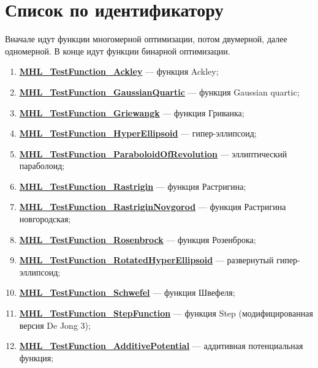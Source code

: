 \section {Список по идентификатору}

Вначале идут функции многомерной оптимизации, потом двумерной, далее одномерной. В конце идут функции бинарной оптимизации.

\begin{enumerate}
 \item \hyperref[TestFunctions:section:MHL_TestFunction_Ackley]{\textbf{MHL\_TestFunction\_Ackley}} --- функция Ackley;
 \item \hyperref[TestFunctions:section:MHL_TestFunction_GaussianQuartic]{\textbf{MHL\_TestFunction\_GaussianQuartic}} --- функция Gaussian quartic;
 \item \hyperref[TestFunctions:section:MHL_TestFunction_Griewangk]{\textbf{MHL\_TestFunction\_Griewangk}} --- функция Гриванка;
 \item \hyperref[TestFunctions:section:MHL_TestFunction_HyperEllipsoid]{\textbf{MHL\_TestFunction\_HyperEllipsoid}} --- гипер-эллипсоид;
 \item \hyperref[TestFunctions:section:MHL_TestFunction_ParaboloidOfRevolution]{\textbf{MHL\_TestFunction\_ParaboloidOfRevolution}} --- эллиптический параболоид;
 \item \hyperref[TestFunctions:section:MHL_TestFunction_Rastrigin]{\textbf{MHL\_TestFunction\_Rastrigin}} --- функция Растригина;
 \item \hyperref[TestFunctions:section:MHL_TestFunction_RastriginNovgorod]{\textbf{MHL\_TestFunction\_RastriginNovgorod}} --- функция Растригина новгородская;
 \item \hyperref[TestFunctions:section:MHL_TestFunction_Rosenbrock]{\textbf{MHL\_TestFunction\_Rosenbrock}} --- функция Розенброка;
 \item \hyperref[TestFunctions:section:MHL_TestFunction_RotatedHyperEllipsoid]{\textbf{MHL\_TestFunction\_RotatedHyperEllipsoid}} --- развернутый гипер-эллипсоид;
 \item \hyperref[TestFunctions:section:MHL_TestFunction_Schwefel]{\textbf{MHL\_TestFunction\_Schwefel}} --- функция Швефеля;
 \item \hyperref[TestFunctions:section:MHL_TestFunction_StepFunction]{\textbf{MHL\_TestFunction\_StepFunction}} --- функция Step (модифицированная версия De Jong 3);
 \item \hyperref[TestFunctions:section:MHL_TestFunction_AdditivePotential]{\textbf{MHL\_TestFunction\_AdditivePotential}} --- аддитивная потенциальная функция;

\end{enumerate}
